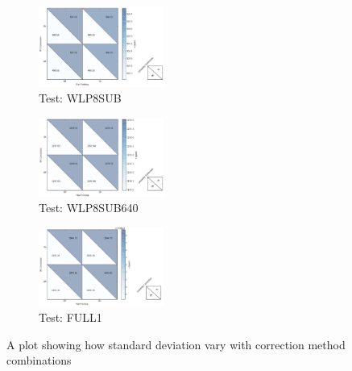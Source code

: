 \documentclass{aastex6}
\begin{document}
\begin{figure}
    \centering
    \begin{subfigure}{1}
        \includegraphics[width=0.45\textwidth]{correction1}
        \caption{Test: WLP8SUB}
    \end{subfigure}
    \begin{subfigure}{2}
        \includegraphics[width=0.45\textwidth]{correction2}
        \caption{Test: WLP8SUB640}
    \end{subfigure}
    \begin{subfigure}{3}
        \includegraphics[width=0.45\textwidth]{correction3}
        \caption{Test: FULL1}
    \end{subfigure}
    \caption{A plot showing how standard deviation vary with correction method combinations}
\end{figure}
\end{document}
